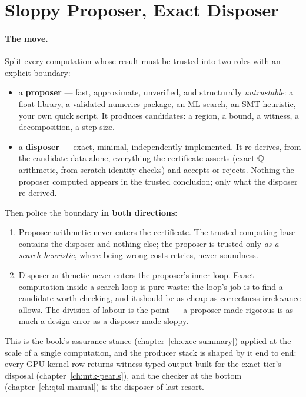 \section{Sloppy Proposer, Exact Disposer}
\label{sec:ckbk-proposer-disposer}

\paragraph{The move.} Split every computation whose result must be
trusted into two roles with an explicit boundary:

\begin{itemize}
\item a \textbf{proposer} --- fast, approximate, unverified, and
  structurally \emph{untrustable}: a float library, a
  validated-numerics package, an ML search, an SMT heuristic, your own
  quick script. It produces candidates: a region, a bound, a witness, a
  decomposition, a step size.
\item a \textbf{disposer} --- exact, minimal, independently
  implemented. It re-derives, from the candidate data alone, everything
  the certificate asserts (exact-$\mathbb{Q}$ arithmetic, from-scratch identity
  checks) and accepts or rejects. Nothing the proposer computed appears
  in the trusted conclusion; only what the disposer re-derived.
\end{itemize}

Then police the boundary \textbf{in both directions}:

\begin{enumerate}
\item Proposer arithmetic never enters the certificate. The trusted
  computing base contains the disposer and nothing else; the proposer
  is trusted only \emph{as a search heuristic}, where being wrong costs
  retries, never soundness.
\item Disposer arithmetic never enters the proposer's inner loop. Exact
  computation inside a search loop is pure waste: the loop's job is to
  find a candidate worth checking, and it should be as cheap as
  correctness-irrelevance allows. The division of labour is the point
  --- a proposer made rigorous is as much a design error as a disposer
  made sloppy.
\end{enumerate}

This is the book's assurance stance (chapter~\ref{ch:exec-summary})
applied at the scale of a single computation, and the producer stack is
shaped by it end to end: every GPU kernel row returns witness-typed
output built for the exact tier's disposal
(chapter~\ref{ch:mtk-pearls}), and the checker at the bottom
(chapter~\ref{ch:qtsl-manual}) is the disposer of last resort.

